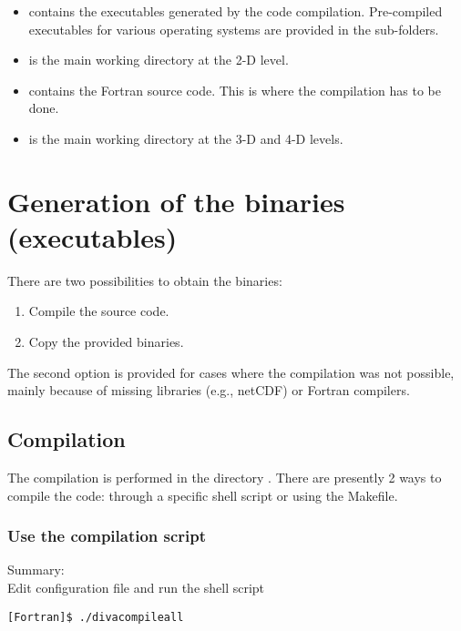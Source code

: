 \begin{itemize}
\item {} contains the executables generated by the code compilation. Pre-compiled executables for various operating systems are provided in the sub-folders.
\item {} is the main working directory at the 2-D level. 
\item {} contains the Fortran source code. This is where the compilation has to be done.
\item {} is the main working directory at the 3-D and 4-D levels.
\end{itemize}

\section{Generation of the binaries (executables)}

There are two possibilities to obtain the binaries: 
\begin{enumerate}
\item Compile the source code.
\item Copy the provided binaries.
\end{enumerate}
The second option is provided for cases where the compilation was not possible, mainly because of missing libraries (e.g., netCDF) or Fortran compilers.

\subsection{Compilation\label{sec:compilation}}

The compilation is performed in the directory . There are presently 2 ways to compile the code: through a specific shell script or using the Makefile.

\subsubsection{Use the compilation script}

Summary:\\ 
Edit configuration file  and run the shell script 
\begin{lstlisting}[style=Bash]
[Fortran]$ ./divacompileall
\end{lstlisting}

